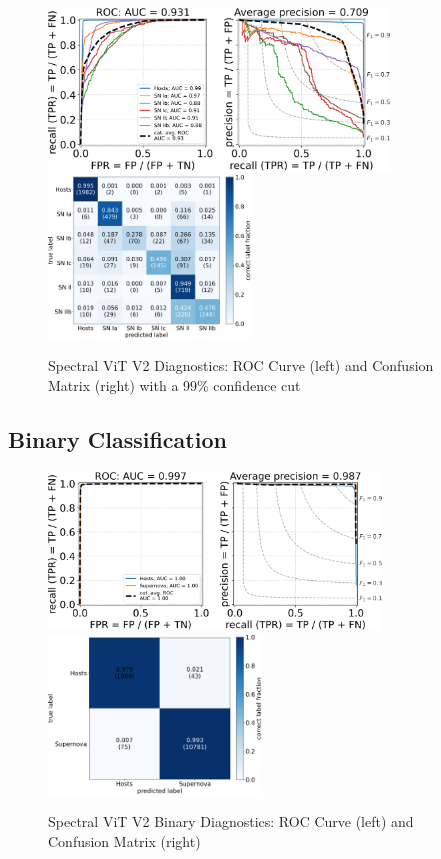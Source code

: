 \begin{figure}[t]
    \centering
    \includegraphics[height=4.3cm]{figures/v2_real/vit_model_V2roc99_e26.png}
    \quad
    \includegraphics[height=4.3cm]{figures/v2_real/vit_model_V2cm99_e26.png}
    \caption{Spectral ViT V2 Diagnostics: ROC Curve (left) and Confusion Matrix (right) with a 99\% confidence
    cut\label{fig:v2_99_qual}}
\end{figure}




\subsection{Binary Classification}

\begin{figure}[t]
    \centering
    \includegraphics[height=4.2cm]{figures/v2_real/vit_model_V2rocfull_binary_e26.png}
    \quad
    \includegraphics[height=4.2cm]{figures/v2_real/vit_model_V2cmfull_binary_e26.png}
    \caption{Spectral ViT V2 Binary Diagnostics: ROC Curve (left) and Confusion Matrix (right)\label{fig:cnn_qual}}
\end{figure}

